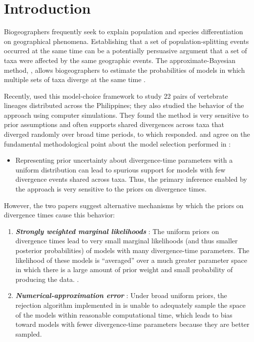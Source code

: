 \section{Introduction}
Biogeographers frequently seek to explain population and species
differentiation on geographical phenomena.
Establishing that a set of population-splitting events occurred
at the same time can be a potentially persuasive argument that a set of taxa
were affected by the same geographic events.
The approximate-Bayesian method, \msb, allows biogeographers to estimate the
probabilities of models in which multiple sets of taxa diverge at the same
time \citep{Hickerson2006,Huang2011}.

Recently, \citet{Oaks2012} used this model-choice framework to study 22 pairs
of vertebrate lineages distributed across the Philippines; they also studied
the behavior of the \msb approach using computer simulations.
They found the method is very sensitive to prior assumptions and often
supports shared divergences across taxa that diverged randomly over broad time
periods, to which \citet{Hickerson2013} responded.
\citet{Oaks2012} and \citet{Hickerson2013} agree on the fundamental
methodological point about the model selection performed in \msb:
\begin{itemize}
   \item Representing prior uncertainty about divergence-time parameters with a
       uniform distribution can lead to spurious support for models with few
       divergence events shared across taxa. Thus, the primary inference
       enabled by the approach is very sensitive to the priors on divergence
       times.
\end{itemize}
However, the two papers suggest alternative mechanisms by which the priors on
divergence times cause this behavior:
\begin{enumerate}[label=\textsl{\textbf{Hypothesis \arabic*)}},ref=\arabic*,align=left]
    \item \textsl{\textbf{Strongly weighted marginal likelihoods}}
        \citep{Oaks2012}:
        The uniform priors on divergence times lead to very small marginal
        likelihoods (and thus smaller posterior probabilities) of models with
        many divergence-time parameters.  The likelihood of these models is
        ``averaged'' over a much greater parameter space in which there is a
        large amount of prior weight and small probability of producing the
        data.  \citep{Jeffreys1939,Lindley1957}. \label{hypML}
    \item \textsl{\textbf{Numerical-approximation error}} \citep{Hickerson2013}:
        Under broad uniform priors, the rejection algorithm implemented in \msb
        is unable to adequately sample the space of the models within
        reasonable computational time, which leads to bias toward models with
        fewer divergence-time parameters because they are better sampled.
        \label{hypError}
\end{enumerate}
